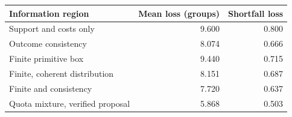 \begin{tabular}{lrr}
\toprule
Information region & Mean loss (groups) & Shortfall loss \\
\midrule
Support and costs only & 9.600 & 0.800 \\
Outcome consistency & 8.074 & 0.666 \\
Finite primitive box & 9.440 & 0.715 \\
Finite, coherent distribution & 8.151 & 0.687 \\
Finite and consistency & 7.720 & 0.637 \\
Quota mixture, verified proposal & 5.868 & 0.503 \\
\bottomrule
\end{tabular}
